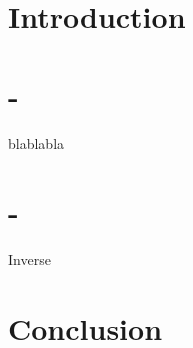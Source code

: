 
\section*{Introduction}

\section{-}
blablabla

\section{-}
\begin{algorithm}
	
	\caption{Inverse}\label{alg:Inverse}
\end{algorithm}

\section*{Conclusion}